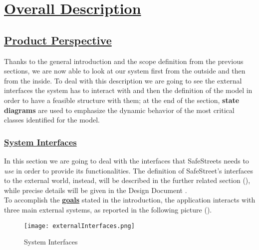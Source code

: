 \section[Overall Description]{\hyperlink{toc}{Overall Description}}
\label{sec:overallDescription}
\subsection[Product Perspective]{\hyperlink{toc}{Product Perspective}}
	Thanks to the general introduction and the scope definition from the previous sections, we are now able to look at our system first from the outside and then from the inside. To deal with this description we are going to see the external interfaces the system has to interact with and then the definition of the model in order to have a feasible structure with them; at the end of the section, \textbf{state diagrams} are used to emphasize the dynamic behavior of the most critical classes identified for the model.
	\subsubsection[System Interfaces]{\hyperlink{toc}{System Interfaces}}
		\label{sec:systemInterfaces}
		In this section we are going to deal with the interfaces that SafeStreets needs to \emph{use} in order to provide its functionalities. The definition of SafeStreet's interfaces to the external world, instead, will be described in the further related section (), while precise details will be given in the Design Document \cite{DD}.\\
	
		To accomplish the \hyperref[sec:goals]{\textbf{goals}} stated in the introduction, the application interacts with three main external systems, as reported in the following picture ().  
		\vspace{0,3cm}
		
		\begin{figure}[h]
			\centering
			\texttt{[image: externalInterfaces.png]}
			\caption{\label{fig:systemInterfaces}System Interfaces}
		\end{figure}
		
